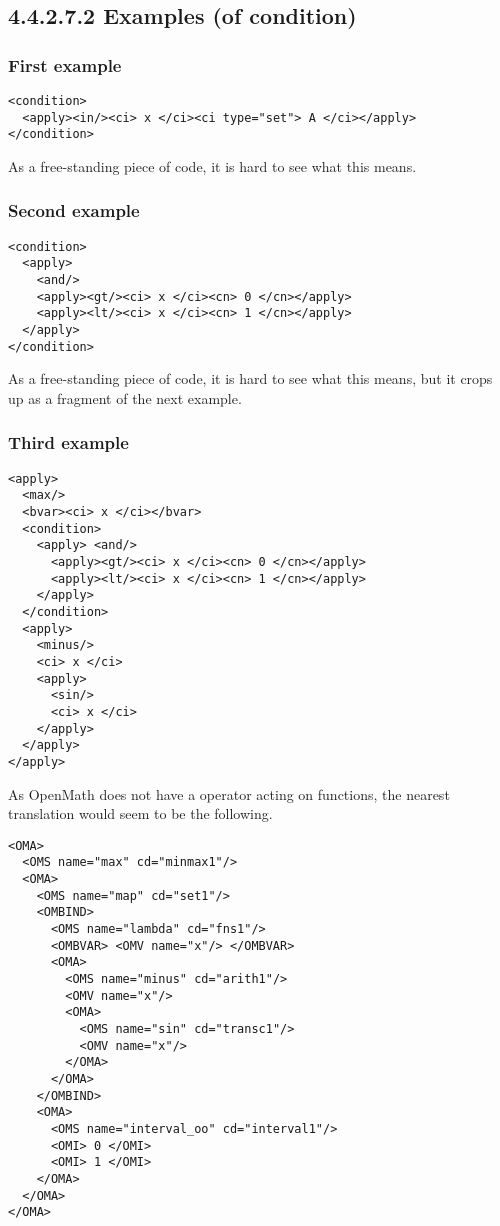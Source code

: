 \documentclass{llncs}
\begin{document}
{\subsection{4.4.2.7.2 Examples (of condition)}\label{44272}
\subsubsection{First example}\label{442721}
\begin{lstlisting}[language=MathML2]
<condition>
  <apply><in/><ci> x </ci><ci type="set"> A </ci></apply>
</condition>
\end{lstlisting}
As a free-standing piece of code, it is hard to see what this means.
\subsubsection{Second example}\label{442722}
\begin{lstlisting}[language=MathML2]
<condition>
  <apply>
    <and/>
    <apply><gt/><ci> x </ci><cn> 0 </cn></apply>
    <apply><lt/><ci> x </ci><cn> 1 </cn></apply>
  </apply>
</condition>
\end{lstlisting}
As a free-standing piece of code, it is hard to see what this means, but it
crops up as a fragment of the next example.
\subsubsection{Third example}\label{442723}
\begin{lstlisting}[language=MathML2]
<apply>
  <max/>
  <bvar><ci> x </ci></bvar>
  <condition>
    <apply> <and/>
      <apply><gt/><ci> x </ci><cn> 0 </cn></apply>
      <apply><lt/><ci> x </ci><cn> 1 </cn></apply>
    </apply>
  </condition>
  <apply>
    <minus/>
    <ci> x </ci>
    <apply>
      <sin/>
      <ci> x </ci>
    </apply>
  </apply>
</apply>
\end{lstlisting}
As OpenMath does not have a {} operator acting on functions,
the nearest translation would seem to be the following.
\begin{lstlisting} 
<OMA>
  <OMS name="max" cd="minmax1"/>
  <OMA>
    <OMS name="map" cd="set1"/>
    <OMBIND>
      <OMS name="lambda" cd="fns1"/>
      <OMBVAR> <OMV name="x"/> </OMBVAR>
      <OMA>
        <OMS name="minus" cd="arith1"/>
        <OMV name="x"/>
        <OMA>
          <OMS name="sin" cd="transc1"/>
          <OMV name="x"/>
        </OMA>
      </OMA>
    </OMBIND>
    <OMA>
      <OMS name="interval_oo" cd="interval1"/>
      <OMI> 0 </OMI>
      <OMI> 1 </OMI>
    </OMA>
  </OMA>
</OMA>
\end{lstlisting}
}
\end{document}
